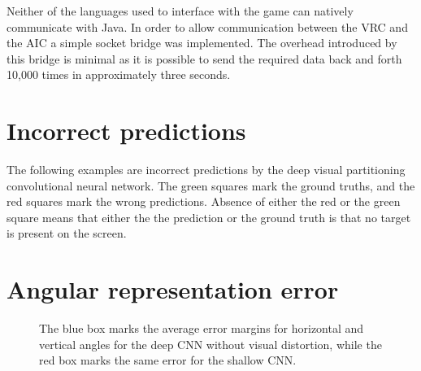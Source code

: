 Neither of the languages used to interface with the game can natively communicate with Java. In order to allow communication between the VRC and the AIC a simple socket bridge was implemented. The overhead introduced by this bridge is minimal as it is possible to send the required data back and forth 10,000 times in approximately three seconds.

\section{Incorrect predictions}
\label{sec:incorrectpredictions}
The following examples are incorrect predictions by the deep visual partitioning convolutional neural network. The green squares mark the ground truths, and the red squares mark the wrong predictions. Absence of either the red or the green square means that either the the prediction  or the ground truth is that no target is present on the screen.

\begin{figure}[H]
	\begin{center}
	\begin{scriptsize}
		\sffamily
		\def\svgwidth{0.95\textwidth}
		
	\end{scriptsize}
	\label{fig:failcollection1}
	\end{center}
\end{figure}


\begin{figure}[H]
	\begin{center}
	\begin{scriptsize}
		\sffamily
		\def\svgwidth{0.95\textwidth}
		
	\end{scriptsize}
	\label{fig:failcollection2}
	\end{center}
\end{figure}

\section{Angular representation error}
\label{sec:angular-error}
\begin{figure}[H]
	\begin{center}
	\begin{scriptsize}
		\sffamily
		\def\svgwidth{1\textwidth}
		
	\end{scriptsize}
	\label{fig:angularerror}
	\caption[AR mean error visualised]{The blue box marks the average error margins for horizontal and vertical angles for the deep CNN without visual distortion, while the red box marks the same error for the shallow CNN.}
	\end{center}
\end{figure}

